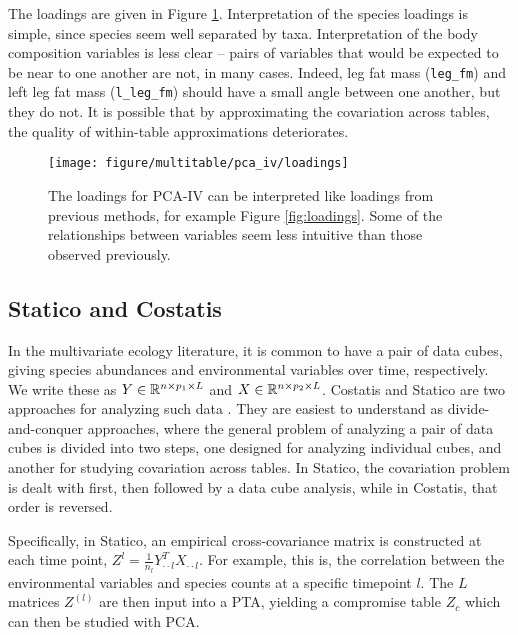 \documentclass[utf8]{frontiersFPHY} %
\begin{document}
The loadings are given in Figure \ref{fig:pca_iv_loadings}. Interpretation of
the species loadings is simple, since species seem well separated by taxa.
Interpretation of the body composition variables is less clear -- pairs of
variables that would be expected to be near to one another are not, in many
cases. Indeed, leg fat mass (\texttt{leg\_fm}) and left leg fat mass
(\texttt{l\_leg\_fm}) should have a small angle between one another, but they do
not. It is possible that by approximating the covariation across tables, the
quality of within-table approximations deteriorates.

\begin{figure}
  \centering
  \texttt{[image: figure/multitable/pca\_iv/loadings]}
  \caption{The loadings for PCA-IV can be interpreted like loadings from
    previous methods, for example Figure \ref{fig:loadings}. Some of the
    relationships between variables seem less intuitive than those observed
    previously.
    \label{fig:pca_iv_loadings} }
\end{figure}

\subsection{Statico and Costatis}
\label{subsec:statico_and_costatis}

In the multivariate ecology literature, it is common to have a pair of data
cubes, giving species abundances and environmental variables over time,
respectively. We write these as $Y \in \mathbb{R}^{n \times p_{1} \times L}$ and $X
\in \mathbb{R}^{n \times p_{2} \times L}$. Costatis and Statico are two approaches
for analyzing such data \citep{thioulouse2011simultaneous}. They are easiest to
understand as divide-and-conquer approaches, where the general problem of
analyzing a pair of data cubes is divided into two steps, one designed for
analyzing individual cubes, and another for studying covariation across tables.
In Statico, the covariation problem is dealt with first, then followed by a data
cube analysis, while in Costatis, that order is reversed.

Specifically, in Statico, an empirical cross-covariance matrix is constructed at
each time point, $Z^{l} = \frac{1}{n_{l}}Y^{T}_{\cdot\cdot l}X_{\cdot \cdot l}$.
For example, this is, the correlation between the environmental variables and
species counts at a specific timepoint $l$. The $L$ matrices $Z^{(l)}$ are then
input into a PTA, yielding a compromise table $Z_{c}$ which can then be studied
with PCA.
\end{document}
